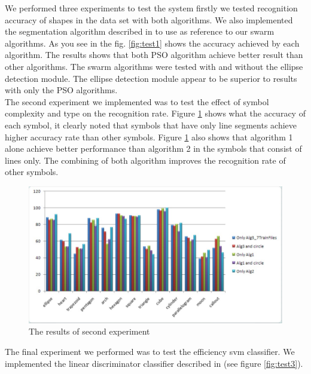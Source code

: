 \documentclass[a4paper,10pt]{IEEEconf}
\begin{document}
We performed three experiments to test the system firstly we tested recognition accuracy of shapes in the data set with both algorithms. We also implemented the segmentation algorithm described in \cite{earlyprocess} to use as reference to our swarm algorithms.  As you see in the fig. \ref{fig:test1} shows the accuracy achieved by each algorithm. The results shows that both PSO algorithm achieve better result than other algorithms.  The swarm algorithms were tested with and without the ellipse detection module. The ellipse detection module appear to be superior to results with only the PSO algorithms.  \\  

The second experiment we implemented was to test the effect of symbol complexity and type on the recognition rate. Figure \ref{fig:test2} shows what the accuracy of each symbol, it clearly noted that symbols that have only line segments achieve higher accuracy rate than other symbols. Figure \ref{fig:test2} also shows that algorithm 1 alone achieve better performance than algorithm 2 in the symbols that consist of lines only. The combining of both algorithm improves the recognition rate of other symbols.  \\
\begin{figure}[]
	\centering
		\includegraphics[scale=0.5]{images/test2.pdf}
	\caption{The results of second experiment}
	\label{fig:test2}
\end{figure}
  The final experiment we performed was to test the efficiency svm classifier. We implemented the linear discriminator classifier described in \cite{gestureexample12}(see figure \ref{fig:test3}).  %
\end{document}
